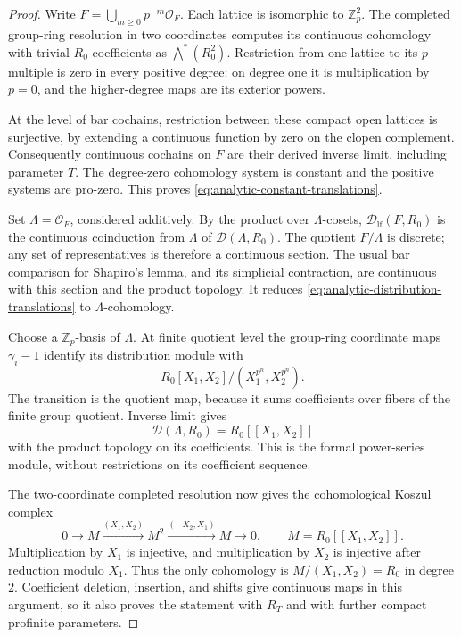 \begin{proof}
Write \(F=\bigcup_{m\geq0}p^{-m}\mathcal O_F\).
Each lattice is isomorphic to \(\mathbb Z_p^2\).
The completed group-ring resolution in two coordinates computes
its continuous cohomology with trivial \(R_0\)-coefficients as
\(\bigwedge^\ast(R_0^2)\).  Restriction from one lattice to its
\(p\)-multiple is zero in every positive degree: on degree one it
is multiplication by \(p=0\), and the higher-degree maps are its
exterior powers.

At the level of bar cochains, restriction between these compact
open lattices is surjective, by extending a continuous function
by zero on the clopen complement.  Consequently continuous
cochains on \(F\) are their derived inverse limit, including
parameter \(T\).  The degree-zero cohomology system is constant
and the positive systems are pro-zero.  This proves
\eqref{eq:analytic-constant-translations}.

Set \(\Lambda=\mathcal O_F\), considered additively.  By the
product over \(\Lambda\)-cosets,
\(\mathcal D_{\mathrm{lf}}(F,R_0)\) is the continuous coinduction
from \(\Lambda\) of \(\mathcal D(\Lambda,R_0)\).
The quotient \(F/\Lambda\) is discrete; any set of representatives
is therefore a continuous section.  The usual bar comparison for
Shapiro's lemma, and its simplicial contraction, are continuous
with this section and the product topology.  It reduces
\eqref{eq:analytic-distribution-translations} to
\(\Lambda\)-cohomology.

Choose a \(\mathbb Z_p\)-basis of \(\Lambda\).
At finite quotient level the group-ring coordinate maps
\(\gamma_i-1\) identify its distribution module with
\[
 R_0[X_1,X_2]/(X_1^{p^n},X_2^{p^n}).
\]
The transition is the quotient map, because it sums coefficients
over fibers of the finite group quotient.  Inverse limit gives
\[
 \mathcal D(\Lambda,R_0)=R_0[[X_1,X_2]]
\]
with the product topology on its coefficients.  This is the
formal power-series module, without restrictions on its
coefficient sequence.

The two-coordinate completed resolution now gives the
cohomological Koszul complex
\begin{equation}
 0\longrightarrow M
 \xrightarrow{(X_1,X_2)}
 M^2
 \xrightarrow{(-X_2,X_1)}
 M\longrightarrow0,\qquad M=R_0[[X_1,X_2]].
 \label{eq:analytic-koszul}
\end{equation}
Multiplication by \(X_1\) is injective, and multiplication by
\(X_2\) is injective after reduction modulo \(X_1\).
Thus the only cohomology is
\(M/(X_1,X_2)=R_0\) in degree \(2\).
Coefficient deletion, insertion, and shifts give continuous maps
in this argument, so it also proves the statement with \(R_T\)
and with further compact profinite parameters.


\end{proof}
